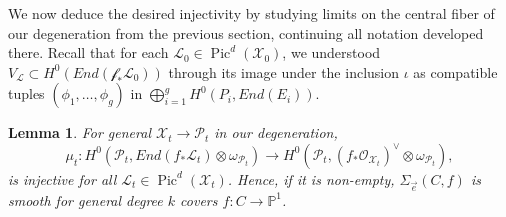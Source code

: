 \documentclass[12pt]{amsart}
\newcommand{\pp}{\mathbb{P}}
\renewcommand{\P}{\mathcal{P}}
\renewcommand{\L}{\mathcal{L}}
\newcommand{\X}{\mathcal{X}}
\renewcommand{\O}{\mathscr{O}}
\newcommand{\f}{\mathcal{f}}
\newtheorem{Lemma}[theorem]{Lemma}
\DeclareMathOperator{\Pic}{Pic}
\theoremstyle{definition}
\theoremstyle{remark}
\theoremstyle{remark}
\numberwithin{equation}{section}
\begin{document}
We now deduce the desired injectivity by studying limits on the central fiber of our degeneration from the previous section, continuing all notation developed there.
Recall that for each $\L_0 \in \Pic^d(\X_0)$, we understood $V_\L \subset H^0(End(\f_*\L_0))$ through its image under the inclusion $\iota$ as compatible tuples $(\phi_1, \ldots, \phi_g)$ in $\bigoplus_{i=1}^g H^0(P_i, End(E_i))$.
\begin{Lemma} \label{sm}
For general $\X_t \rightarrow \P_t $ in our degeneration,
\[
\mu_t: H^0(\P_t, End(f_*\L_t) \otimes \omega_{\P_t}) \rightarrow H^0(\P_t, (f_*\O_{\X_t})^\vee \otimes \omega_{\P_t}),
\]
is injective for all $\L_t \in \Pic^d(\X_t)$. Hence, if it is non-empty, $\Sigma_{\vec{e}}(C, f)$ is smooth for general degree $k$ covers $f\colon  C \rightarrow \pp^1$.
\end{Lemma}
\end{document}
